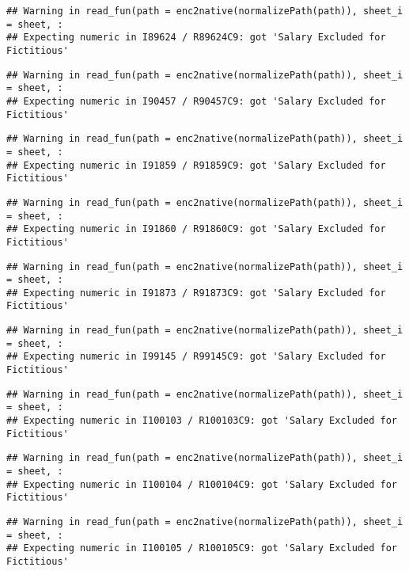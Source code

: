 \documentclass[
]{article}
\begin{document}
\begin{verbatim}
## Warning in read_fun(path = enc2native(normalizePath(path)), sheet_i = sheet, :
## Expecting numeric in I89624 / R89624C9: got 'Salary Excluded for Fictitious'
\end{verbatim}

\begin{verbatim}
## Warning in read_fun(path = enc2native(normalizePath(path)), sheet_i = sheet, :
## Expecting numeric in I90457 / R90457C9: got 'Salary Excluded for Fictitious'
\end{verbatim}

\begin{verbatim}
## Warning in read_fun(path = enc2native(normalizePath(path)), sheet_i = sheet, :
## Expecting numeric in I91859 / R91859C9: got 'Salary Excluded for Fictitious'
\end{verbatim}

\begin{verbatim}
## Warning in read_fun(path = enc2native(normalizePath(path)), sheet_i = sheet, :
## Expecting numeric in I91860 / R91860C9: got 'Salary Excluded for Fictitious'
\end{verbatim}

\begin{verbatim}
## Warning in read_fun(path = enc2native(normalizePath(path)), sheet_i = sheet, :
## Expecting numeric in I91873 / R91873C9: got 'Salary Excluded for Fictitious'
\end{verbatim}

\begin{verbatim}
## Warning in read_fun(path = enc2native(normalizePath(path)), sheet_i = sheet, :
## Expecting numeric in I99145 / R99145C9: got 'Salary Excluded for Fictitious'
\end{verbatim}

\begin{verbatim}
## Warning in read_fun(path = enc2native(normalizePath(path)), sheet_i = sheet, :
## Expecting numeric in I100103 / R100103C9: got 'Salary Excluded for Fictitious'
\end{verbatim}

\begin{verbatim}
## Warning in read_fun(path = enc2native(normalizePath(path)), sheet_i = sheet, :
## Expecting numeric in I100104 / R100104C9: got 'Salary Excluded for Fictitious'
\end{verbatim}

\begin{verbatim}
## Warning in read_fun(path = enc2native(normalizePath(path)), sheet_i = sheet, :
## Expecting numeric in I100105 / R100105C9: got 'Salary Excluded for Fictitious'
\end{verbatim}
\end{document}
